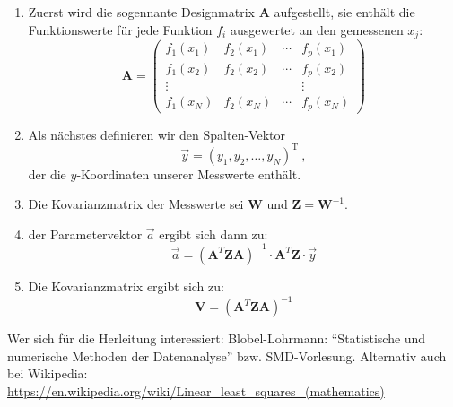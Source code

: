 \documentclass{scrartcl}
\begin{document}
\begin{enumerate}
    \item Zuerst wird die sogennante Designmatrix $\mathbf{A}$ aufgestellt, sie enthält die Funktionswerte für jede Funktion $f_i$ ausgewertet an den gemessenen $x_j$:
        \begin{equation}
            \mathbf{A} = 
            \begin{pmatrix}
                f_1(x_1) & f_2(x_1) & \cdots & f_p(x_1) \\  
                f_1(x_2) & f_2(x_2) & \cdots & f_p(x_2) \\  
                \vdots   &          &        &  \vdots  \\
                f_1(x_N) & f_2(x_N) & \cdots & f_p(x_N) 
            \end{pmatrix}
        \end{equation}
    \item Als nächstes definieren wir den Spalten-Vektor 
        \begin{equation}
            \vec{y} = (y_1, y_2, …, y_N)^\mathrm{T} \ ,
        \end{equation}
        der die $y$-Koordinaten unserer Messwerte enthält.
    \item Die Kovarianzmatrix der Messwerte sei $\mathbf{W}$ und $\mathbf{Z} = \mathbf{W}^{-1}$.
    \item der Parametervektor $\vec{a}$ ergibt sich dann zu:
        \begin{equation}
            \vec{a} = \left(\mathbf{A}^T \mathbf{Z} \mathbf{A}\right)^{-1} \cdot \mathbf{A}^T \mathbf{Z} \cdot \vec{y}
        \end{equation}

    \item Die Kovarianzmatrix ergibt sich zu:
        \begin{equation}
            \mathbf{V} = \left(\mathbf{A}^T \mathbf{Z} \mathbf{A}\right)^{-1}
        \end{equation}
\end{enumerate}
Wer sich für die Herleitung interessiert: Blobel-Lohrmann: \enquote{Statistische und numerische Methoden der Datenanalyse} bzw. SMD-Vorlesung.
Alternativ auch bei Wikipedia: \url{https://en.wikipedia.org/wiki/Linear_least_squares_(mathematics)}
\end{document}
